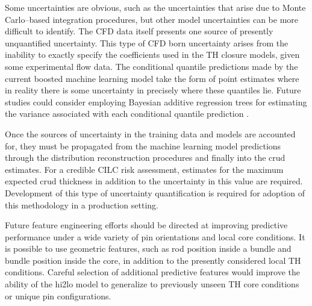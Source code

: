 Some uncertainties are obvious, such as the uncertainties that arise due to Monte Carlo--based integration procedures, but other model uncertainties can be more difficult to identify.  The CFD data itself presents one source of presently unquantified uncertainty.  This type of CFD born uncertainty arises from the inability to exactly specify the coefficients used in the TH closure models, given some experimental flow data.  The conditional quantile predictions made by the current boosted machine learning model take the form of point estimates where in reality there is some uncertainty in precisely where these quantiles lie.  Future studies could consider employing Bayesian additive regression trees for estimating the variance associated with each conditional quantile prediction \cite{chipman2010}.


Once the sources of uncertainty in the training data and models are accounted for, they must be propagated from the machine learning model predictions through the distribution reconstruction procedures and finally into the crud estimates.  For a credible CILC risk assessment, estimates for the maximum expected crud thickness in addition to the uncertainty in this value are required. Development of this type of uncertainty quantification is required for adoption of this methodology in a production setting.

Future feature engineering efforts should be directed at improving predictive performance under a wide variety of pin orientations and local core conditions.  It is possible to use geometric features, such as rod position inside a bundle and bundle position inside the core, in addition to the presently considered local TH conditions.  Careful selection of additional predictive features would improve the ability of the hi2lo model to generalize to previously unseen TH core conditions or unique pin configurations.


